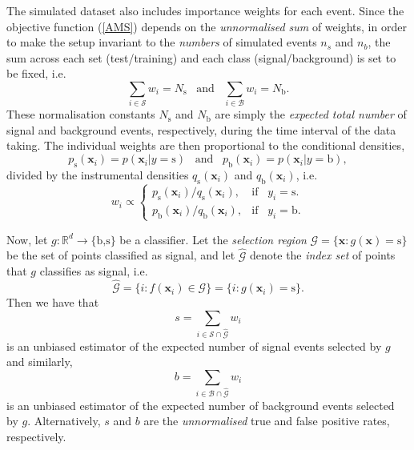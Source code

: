 \documentclass[]{article}
\begin{document}
The simulated dataset also includes importance weights for each event. Since the objective function (\ref{AMS}) depends on the \textit{unnormalised sum} of weights, in order to make the setup invariant to the \textit{numbers} of simulated events $n_s$ and $n_b$, the sum across each set (test/training) and each class (signal/background) is set to be fixed, i.e.
\begin{equation}
	\sum_{i \in \mathcal{S}} w_i = N_\text{s} \hspace{10pt} \text{and} \hspace{10pt} \sum_{i \in \mathcal{B}} w_i = N_\text{b}.
\end{equation}
These normalisation constants $N_\text{s}$ and $N_\text{b}$ are simply the \textit{expected total number} of signal and background events, respectively, during the time interval of the data taking. The individual weights are then proportional to the conditional densities,
$$ p_\text{s}(\bm{x}_i) = p(\bm{x}_i|y=\text{s}) \hspace{10pt} \text{and} \hspace{10pt} p_\text{b}(\bm{x}_i) = p(\bm{x}_i|y=\text{b}), $$
divided by the instrumental densities $q_\text{s}(\bm{x}_i)$ and $q_\text{b}(\bm{x}_i)$, i.e.
\begin{equation}
	w_i \propto \begin{cases}
	p_\text{s}(\bm{x}_i)/ q_\text{s}(\bm{x}_i), & \text{if} \hspace{10pt} y_i= \text{s}. \\
	p_\text{b}(\bm{x}_i) / q_\text{b}(\bm{x}_i), & \text{if} \hspace{10pt} y_i= \text{b}.
	\end{cases}
\end{equation}


Now, let $g: \mathbb{R}^d \to \{\text{b,s}\}$ be a classifier. Let the \textit{selection region} $\mathcal{G} = \{\bm{x}: g(\bm{x}) = \text{s}\}$ be the set of points classified as signal, and let $\hat{\mathcal{G}}$ denote the \textit{index set} of points that $g$ classifies as signal, i.e.
$$ \hat{\mathcal{G}} = \{i:f(\bm{x}_i) \in \mathcal{G}\} = \{i : g(\bm{x}_i) = \text{s}\}. $$
Then we have that
\begin{equation}
\label{s weights}
	s = \sum_{i \in \mathcal{S} \cap \hat{\mathcal{G}}} w_i
\end{equation}
is an unbiased estimator of the expected number of signal events selected by $g$ and similarly,
\begin{equation}
\label{b weights}
b = \sum_{i \in \mathcal{B} \cap \hat{\mathcal{G}}} w_i
\end{equation}
is an unbiased estimator of the expected number of background events selected by $g$. Alternatively, $s$ and $b$ are the \textit{unnormalised} true and false positive rates, respectively.
\end{document}

